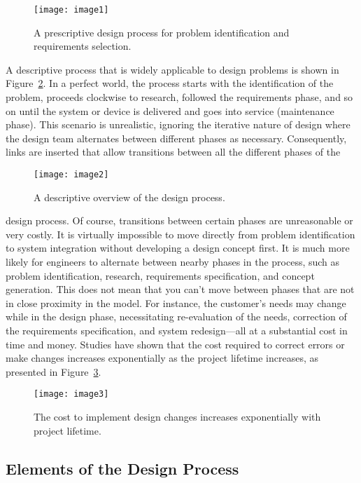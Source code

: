 \begin{figure}[h]
\texttt{[image: image1]}
\caption{A prescriptive design process for problem
identification and requirements selection.}
\label{figure:prescriptiveDesign}
\end{figure}

A descriptive process that is widely applicable to design problems is
shown in Figure~\ref{figure:overviewDesignProcess}. 
In a perfect world, the process starts with the
identification of the problem, proceeds clockwise to research, followed
the requirements phase, and so on until the system or device is
delivered and goes into service (maintenance phase). This scenario is
unrealistic, ignoring the iterative nature of design where the design
team alternates between different phases as necessary. Consequently,
links are inserted that allow transitions between all the different
phases of the

\begin{figure}[h]
\texttt{[image: image2]}
\caption{ A descriptive overview of the design process.}
\label{figure:overviewDesignProcess}
\end{figure}

design process. Of course, transitions between certain phases are
unreasonable or very costly. It is virtually impossible to move directly
from problem identification to system integration without developing a
design concept first. It is much more likely for engineers to alternate
between nearby phases in the process, such as problem identification,
research, requirements specification, and concept generation. This does
not mean that you can't move between phases that are not in close
proximity in the model. For instance, the customer's needs may change
while in the design phase, necessitating re-evaluation of the needs,
correction of the requirements specification, and system redesign---all
at a substantial cost in time and money. Studies have shown that the
cost required to correct errors or make changes increases exponentially
as the project lifetime increases, as presented in Figure~\ref{figure:costVsLife}.

\begin{figure}[h]
\texttt{[image: image3]}
\caption{The cost to implement design changes increases exponentially with project lifetime.}
\label{figure:costVsLife}
\end{figure}

\subsection{Elements of the Design Process}

